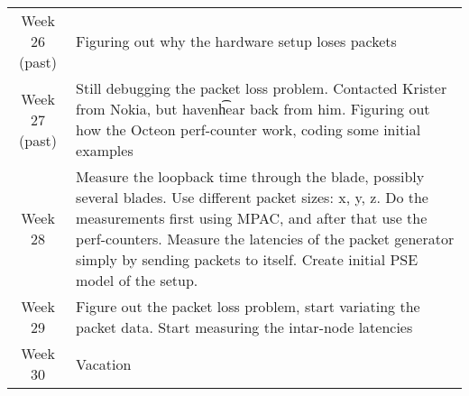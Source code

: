 \begin{table}[h]
  \centering
  \begin{tabular}{@{}c|p{10cm}@{}}
    \toprule
    Week 26 (past) & Figuring out why the hardware setup loses packets \\
    Week 27 (past) & Still debugging the packet loss problem. Contacted Krister from Nokia, but haven\t hear back from him. Figuring out how the Octeon perf-counter work, coding some initial examples \\
    Week 28 & Measure the loopback time through the blade, possibly several blades. Use different packet sizes: x, y, z. Do the measurements first using MPAC, and after that use the perf-counters. Measure the latencies of the packet generator simply by sending packets to itself. Create initial PSE model of the setup. \\
    Week 29 & Figure out the packet loss problem, start variating the packet data. Start measuring the intar-node latencies \\
    Week 30 & Vacation \\
    \bottomrule
  \end{tabular}
\end{table}

